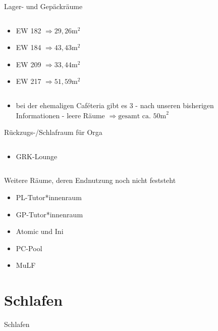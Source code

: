 \documentclass[compress,]{beamer}
\begin{document}
\begin{frame}{Lager- und Gepäckräume}
  \begin{columns}[onlytextwidth]
    \begin{column}{0.3\textwidth}
      \begin{itemize}
        \item<1-> EW 182 $\Rightarrow 29,26 \mbox{m}^{2}$
        \item<2-> EW 184 $\Rightarrow 43,43 \mbox{m}^{2}$
        \item<3-> EW 209 $\Rightarrow 33,44 \mbox{m}^{2}$
        \item<4-> EW 217 $\Rightarrow 51,59 \mbox{m}^{2}$
      \end{itemize}
    \end{column}
    \begin{column}{0.7\textwidth}
    \end{column}
  \end{columns}
  \begin{itemize}
    \item<6-> bei der ehemaligen Caféteria gibt es 3 - nach unseren bisherigen Informationen - leere Räume $\Rightarrow\mbox{gesamt ca. 50m}^{2}$
  \end{itemize}
\end{frame}

\begin{frame}{Rückzugs-/Schlafraum für Orga}
  \begin{columns}[onlytextwidth]
    \begin{column}{0.5\textwidth}
      \begin{itemize}
        \item<1-> GRK-Lounge
      \end{itemize}
    \end{column}
    \begin{column}{0.5\textwidth}
    \end{column}
  \end{columns}
\end{frame}

\begin{frame}{Weitere Räume, deren Endnutzung noch nicht feststeht}
  \begin{itemize}
    \item PL-Tutor*innenraum
    \item GP-Tutor*innenraum
    \item Atomic und Ini
    \item PC-Pool
    \item MuLF
  \end{itemize}
\end{frame}

\section{Schlafen}
\begin{frame}{Schlafen}
\end{frame}
\end{document}
